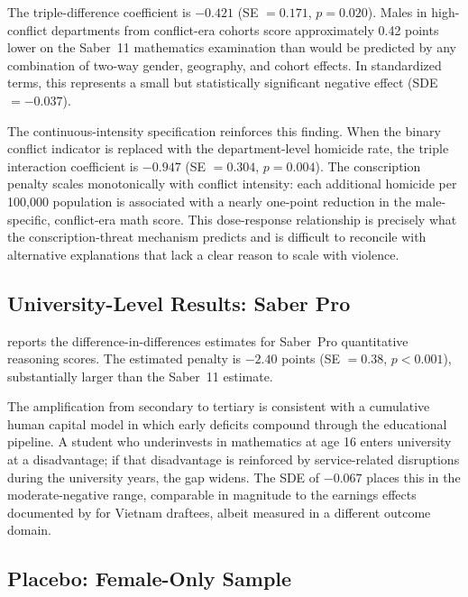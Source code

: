 \documentclass[12pt]{article}
\begin{document}


The triple-difference coefficient is $-0.421$ (SE $= 0.171$, $p = 0.020$). Males in high-conflict departments from conflict-era cohorts score approximately 0.42 points lower on the Saber~11 mathematics examination than would be predicted by any combination of two-way gender, geography, and cohort effects. In standardized terms, this represents a small but statistically significant negative effect (SDE $= -0.037$).

The continuous-intensity specification reinforces this finding. When the binary conflict indicator is replaced with the department-level homicide rate, the triple interaction coefficient is $-0.947$ (SE $= 0.304$, $p = 0.004$). The conscription penalty scales monotonically with conflict intensity: each additional homicide per 100,000 population is associated with a nearly one-point reduction in the male-specific, conflict-era math score. This dose-response relationship is precisely what the conscription-threat mechanism predicts and is difficult to reconcile with alternative explanations that lack a clear reason to scale with violence.

\subsection{University-Level Results: Saber Pro}

 reports the difference-in-differences estimates for Saber~Pro quantitative reasoning scores. The estimated penalty is $-2.40$ points (SE $= 0.38$, $p < 0.001$), substantially larger than the Saber~11 estimate.



The amplification from secondary to tertiary is consistent with a cumulative human capital model in which early deficits compound through the educational pipeline. A student who underinvests in mathematics at age 16 enters university at a disadvantage; if that disadvantage is reinforced by service-related disruptions during the university years, the gap widens. The SDE of $-0.067$ places this in the moderate-negative range, comparable in magnitude to the earnings effects documented by \citet{angrist1990} for Vietnam draftees, albeit measured in a different outcome domain.

\subsection{Placebo: Female-Only Sample}
\end{document}
